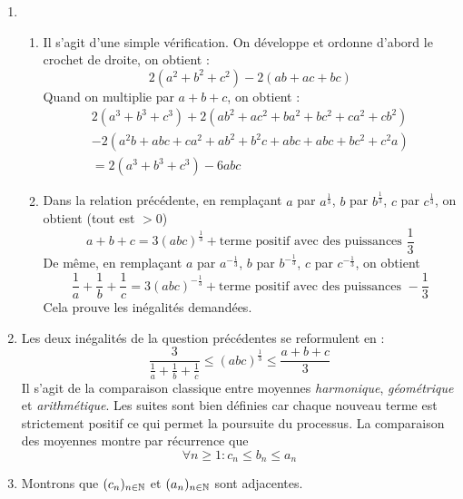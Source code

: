 \begin{enumerate}
 \item \begin{enumerate}
 \item Il s'agit d'une simple vérification. On développe et ordonne d'abord le crochet de droite, on obtient :
\begin{displaymath}
 2(a^2+b^2+c^2) -2(ab+ac+bc)
\end{displaymath}
Quand on multiplie par $a+b+c$, on obtient :
\begin{multline*}
 2(a^3+b^3+c^3) + 2(ab^2+ac^2+ba^2+bc^2+ca^2+cb^2)\\
-2(a^2b+abc+ca^2+ab^2+b^2c+abc+abc+bc^2+c^2a)\\
= 2(a^3+b^3+c^3) -6abc
\end{multline*}
\item Dans la relation précédente, en remplaçant $a$ par $a^{\frac{1}{3}}$, $b$ par $b^{\frac{1}{3}}$, $c$ par $c^{\frac{1}{3}}$, on obtient (tout est $>0$)
\begin{displaymath}
 a+b+c = 3(abc)^{\frac{1}{3}} + \text{terme positif avec des puissances }\frac{1}{3}
\end{displaymath}
De même, en remplaçant $a$ par $a^{-\frac{1}{3}}$, $b$ par $b^{-\frac{1}{3}}$, $c$ par $c^{-\frac{1}{3}}$, on obtient
\begin{displaymath}
 \frac{1}{a} + \frac{1}{b} + \frac{1}{c} = 3(abc)^{-\frac{1}{3}} + \text{terme positif avec des puissances }-\frac{1}{3}
\end{displaymath}
Cela prouve les inégalités demandées.
\end{enumerate}
\item Les deux inégalités de la question précédentes se reformulent en :
\begin{displaymath}
 \frac{3}{\frac{1}{a}+\frac{1}{b}+\frac{1}{c}} \leq (abc)^{\frac{1}{3}} \leq \frac{a+b+c}{3}
\end{displaymath}
Il s'agit de la comparaison classique entre moyennes \emph{harmonique}, \emph{géométrique} et \emph{arithmétique}.\newline
Les suites sont bien définies car chaque nouveau terme est strictement positif ce qui permet la poursuite du processus. La comparaison des moyennes montre par récurrence que 
\begin{displaymath}
 \forall n \geq 1 : c_n \leq b_n \leq a_n
\end{displaymath}
\item Montrons que $(c_n)_{n\in\mathbb{N}}$ et $(a_n)_{n\in\mathbb{N}}$ sont adjacentes. \newline

\end{enumerate}
